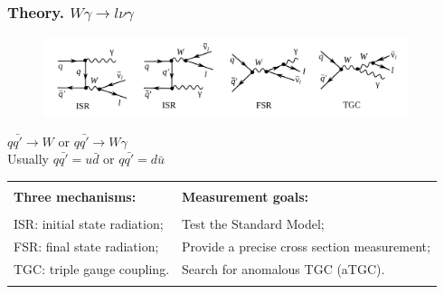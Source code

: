 \begin{frame}\frametitle{Theory. $W\gamma\rightarrow l\nu\gamma$}
   \begin{figure}[htb]
      \begin{center}
        \scriptsize
          \includegraphics[width=0.95\textwidth]{../figs/ForPresentation/feynmWg_LO_01.png}
       \end{center}
    \end{figure}
\scriptsize
$q\bar{q'}\rightarrow W$ or $q\bar{q'}\rightarrow W\gamma$\\
Usually $q\bar{q'}=u\bar{d}$ or  $q\bar{q'}=d\bar{u}$\\

\begin{table}[h]
  \scriptsize
  \begin{center}
   \begin{tabular}{|l|l|}
    \hline
         &  \\ 
     {\bfseries{Three mechanisms:}}  & {\bfseries{Measurement goals:}}  \\
         &  \\ 
     ISR: initial state radiation;   & Test the Standard Model;  \\ 
     FSR: final state radiation;    &  Provide a precise cross section measurement; \\ 
     TGC: triple gauge coupling.    &  Search for anomalous TGC (aTGC).\\ 
    &  \\  \hline
  \end{tabular}
  \end{center}
\end{table}

\end{frame}%

